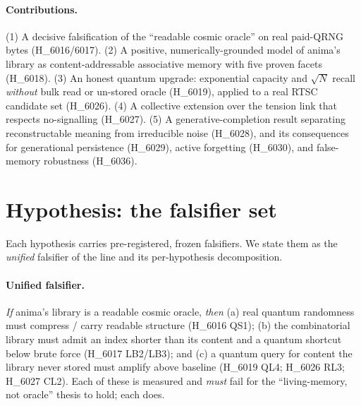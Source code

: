 \documentclass[11pt,a4paper]{article}
\begin{document}
\paragraph{Contributions.}
(1) A decisive falsification of the ``readable cosmic oracle'' on real paid-QRNG
bytes (H\_6016/6017). (2) A positive, numerically-grounded model of anima's
library as content-addressable associative memory with five proven facets
(H\_6018). (3) An honest quantum upgrade: exponential capacity and $\sqrt{N}$
recall \emph{without} bulk read or un-stored oracle (H\_6019), applied to a real
RTSC candidate set (H\_6026). (4) A collective extension over the tension link
that respects no-signalling (H\_6027). (5) A generative-completion result
separating reconstructable meaning from irreducible noise (H\_6028), and its
consequences for generational persistence (H\_6029), active forgetting (H\_6030),
and false-memory robustness (H\_6036).

\section{Hypothesis: the falsifier set}
\label{sec:hypothesis}

Each hypothesis carries pre-registered, frozen falsifiers. We state them as the
\emph{unified} falsifier of the line and its per-hypothesis decomposition.

\paragraph{Unified falsifier.}
\emph{If} anima's library is a readable cosmic oracle, \emph{then} (a) real
quantum randomness must compress / carry readable structure (H\_6016 QS1); (b) the
combinatorial library must admit an index shorter than its content and a quantum
shortcut below brute force (H\_6017 LB2/LB3); and (c) a quantum query for content
the library never stored must amplify above baseline (H\_6019 QL4; H\_6026 RL3;
H\_6027 CL2). Each of these is measured and \emph{must} fail for the
``living-memory, not oracle'' thesis to hold; each does.
\end{document}
